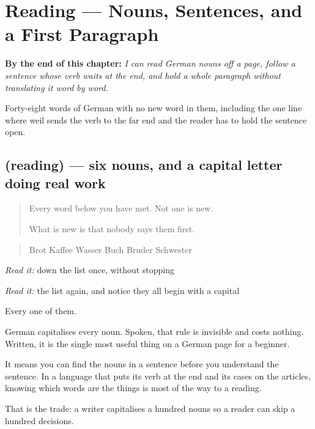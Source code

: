 
\chapter{Reading — Nouns, Sentences, and a First Paragraph}
\label{ch:ge-erste-lesung}

\begin{chapteropening}
\textbf{By the end of this chapter:} \emph{I can read German nouns off a page, follow a sentence whose verb waits at the end, and hold a whole paragraph without translating it word by word.}

Forty-eight words of German with no new word in them, including the one line where weil sends the verb to the far end and the reader has to hold the sentence open.
\end{chapteropening}

\section[(reading)]{(reading) — six nouns, and a capital letter doing real work}

\label{lesson:GE-C52-words}



\begin{quote}
Every word below you have met. Not one is new.

What is new is that nobody says them first.
\end{quote}

\begin{tcolorbox}[breakable,skin=enhanced,colback=orange!6,colframe=orange!45!black,boxrule=0.5pt,arc=1mm,left=6pt,right=6pt,top=4pt,bottom=4pt,fonttitle=\bfseries,title={Read this}]
\begin{quote}
Brot Kaffee Wasser Buch Bruder Schwester
\end{quote}

\emph{Read it:} down the list once, without stopping

\emph{Read it:} the list again, and notice they all begin with a capital

Every one of them.
\end{tcolorbox}

\begin{grammarlens}[title={Grammar Lens: the capital is information}]
German capitalises every noun. Spoken, that rule is invisible and costs nothing. Written, it is the single most useful thing on a German page for a beginner.

It means you can find the nouns in a sentence before you understand the sentence. In a language that puts its verb at the end and its cases on the articles, knowing which words are the things is most of the way to a reading.

That is the trade: a writer capitalises a hundred nouns so a reader can skip a hundred decisions.
\end{grammarlens}

